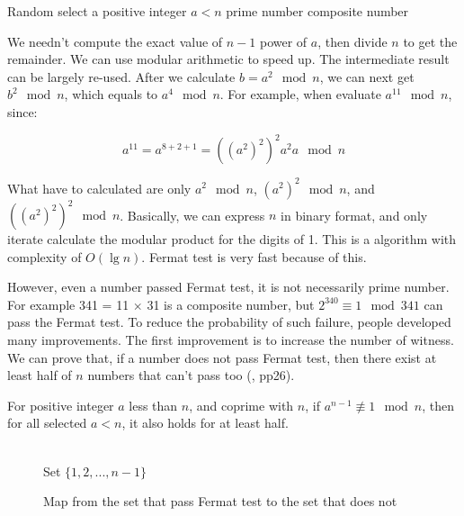 \documentclass{article}
\begin{document}
\begin{algorithmic}
  \State Random select a positive integer $a < n$
    \State \Return prime number
  \Else
    \State \Return composite number
  \EndIf
\EndFunction
\end{algorithmic}

We needn't compute the exact value of $n-1$ power of $a$, then divide $n$ to get the remainder. We can use modular arithmetic to speed up. The intermediate result can be largely re-used. After we calculate $b = a^2 \mod n$, we can next get $b^2 \mod n$, which equals to $a^4 \mod n$. For example, when evaluate $a^{11} \mod n$, since:

\[
a^{11} = a^{8 + 2 + 1} = ((a^2)^2)^2a^2a \mod n
\]

What have to calculated are only $a^2 \mod n$, $(a^2)^2 \mod n$, and $((a^2)^2)^2 \mod n$. Basically, we can express $n$ in binary format, and only iterate calculate the modular product for the digits of 1. This is a algorithm with complexity of $O(\lg n)$. Fermat test is very fast because of this.

However, even a number passed Fermat test, it is not necessarily prime number. For example 341 = 11 $\times$ 31 is a composite number, but $2^{340} \equiv 1 \mod 341$ can pass the Fermat test. To reduce the probability of such failure, people developed many improvements. The first improvement is to increase the number of witness. We can prove that, if a number does not pass Fermat test, then there exist at least half of $n$ numbers that can't pass too (\cite{Algorithms-DPV}, pp26).

\begin{theorem}
For positive integer $a$ less than $n$, and coprime with $n$, if $a^{n-1} \not\equiv 1 \mod n$, then for all selected $a < n$, it also holds for at least half.
\end{theorem}

\begin{figure}[htbp]
\centering
{} \\
Set $\{1, 2, ..., n-1\}$
\caption{Map from the set that pass Fermat test to the set that does not}
\label{fig:Fermat-test}
\end{figure}
\end{document}
